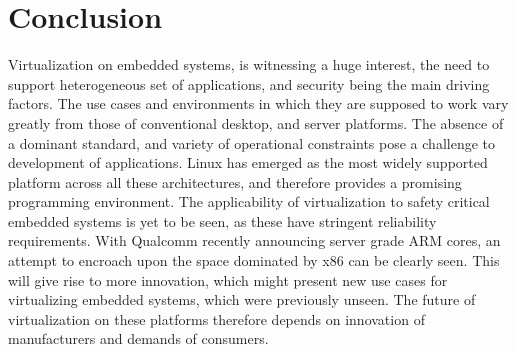 \documentclass[seminar,twoside]{iitbreport}
\begin{document}
\section{Conclusion}
Virtualization on embedded systems, is witnessing a huge interest, the need to support heterogeneous set of applications, and security being the main driving factors.
The use cases and environments in which they are supposed to work vary greatly from those of conventional desktop, and server platforms. The absence of a dominant standard,
and variety of operational constraints pose a challenge to development of applications. Linux has emerged as the most widely supported platform across all these
architectures, and therefore provides a promising programming environment. The applicability of virtualization to safety critical embedded systems is yet to be seen, as these
have stringent reliability requirements. With Qualcomm recently announcing server grade ARM cores, an attempt to encroach upon the space dominated by x86 can be clearly seen.
This will give rise to more innovation, which might present new use cases for virtualizing embedded systems, which were previously unseen. The future of virtualization
on these platforms therefore depends on innovation of manufacturers and demands of consumers.
\clearpage
{}


\end{document}
